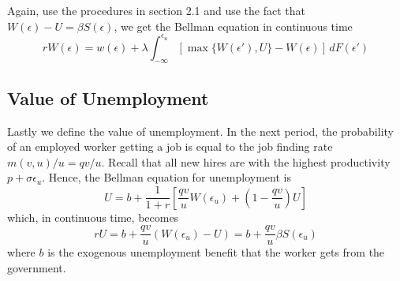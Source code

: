 \documentclass[12pt]{article}
\begin{document}
Again, use the procedures in section 2.1 and use the fact that $W(\epsilon) - U = \beta S(\epsilon)$, we get the Bellman equation in continuous time
\begin{equation} \label{eq:W}
	r W(\epsilon) = w(\epsilon) + \lambda  \int_{-\infty}^{\epsilon_u}[\max\{W(\epsilon'), U\} - W(\epsilon)] \, dF(\epsilon')
\end{equation}

\subsection{Value of Unemployment}

Lastly we define the value of unemployment. In the next period, the probability of an employed worker getting a job is equal to the job finding rate $m(v,u)/u = q v/u$. Recall that all new hires are with the highest productivity $p + \sigma \epsilon_u$. Hence, the Bellman equation for unemployment is
\[U = b + \frac{1}{1+r} \left[\frac{qv}{u} W(\epsilon_u) + \left(1-\frac{qv}{u}\right) U\right]\]
which, in continuous time, becomes
\begin{equation} \label{eq:U}
	r U = b + \frac{qv}{u} (W(\epsilon_u) - U) = b + \frac{qv}{u} \beta S(\epsilon_u)
\end{equation}
where $b$ is the exogenous unemployment benefit that the worker gets from the government.
\end{document}
